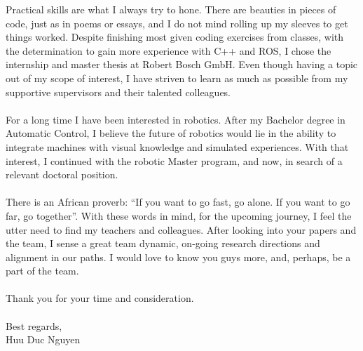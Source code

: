 \documentclass[
10pt, A4, english,
draft = false,
twoside = false,
]{article}
\begin{document}
{		Practical skills are what I always try to hone. There are beauties in pieces of code, just as in poems or essays, and I do not mind rolling up my sleeves to get things worked. Despite finishing most given coding exercises from classes, with the determination to gain more experience with C++ and ROS, I chose the internship and master thesis at Robert Bosch GmbH. Even though having a topic out of my scope of interest, I have striven to learn as much as possible from my supportive supervisors and their talented colleagues.\\~\\
		For a long time I have been interested in robotics. After my Bachelor degree in Automatic Control, I believe the future of robotics would lie in the ability to integrate machines with visual knowledge and simulated experiences. With that interest, I continued with the robotic Master program, and now, in search of a relevant doctoral position.\\~\\
		There is an African proverb: “If you want to go fast, go alone. If you want to go far, go together”. With these words in mind, for the upcoming journey, I feel the utter need to find my teachers and colleagues. After looking into your papers and the team, I sense a great team dynamic, on-going research directions and alignment in our paths. I would love to know you guys more, and, perhaps, be a part of the team.\\~\\
		Thank you for your time and consideration.\\~\\		
		Best regards,\\
		Huu Duc Nguyen		
	}
\end{document}
